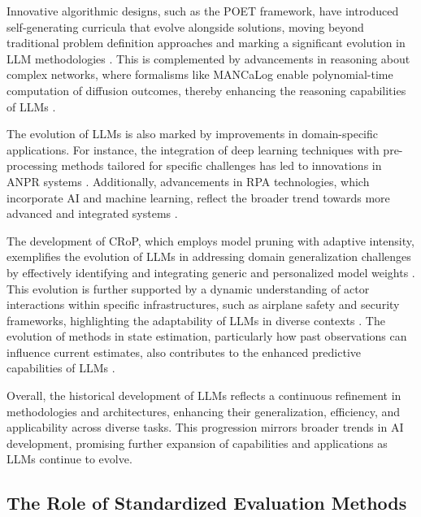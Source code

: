 Innovative algorithmic designs, such as the POET framework, have introduced self-generating curricula that evolve alongside solutions, moving beyond traditional problem definition approaches and marking a significant evolution in LLM methodologies \cite{wang2019pairedopenendedtrailblazerpoet}. This is complemented by advancements in reasoning about complex networks, where formalisms like MANCaLog enable polynomial-time computation of diffusion outcomes, thereby enhancing the reasoning capabilities of LLMs \cite{shakarian2022reasoningcomplexnetworkslogic}.



The evolution of LLMs is also marked by improvements in domain-specific applications. For instance, the integration of deep learning techniques with pre-processing methods tailored for specific challenges has led to innovations in ANPR systems \cite{adak2022automaticnumberplaterecognition}. Additionally, advancements in RPA technologies, which incorporate AI and machine learning, reflect the broader trend towards more advanced and integrated systems \cite{pandy2024advancementsroboticsprocessautomation}.



The development of CRoP, which employs model pruning with adaptive intensity, exemplifies the evolution of LLMs in addressing domain generalization challenges by effectively identifying and integrating generic and personalized model weights \cite{kaur2024cropcontextwiserobuststatic}. This evolution is further supported by a dynamic understanding of actor interactions within specific infrastructures, such as airplane safety and security frameworks, highlighting the adaptability of LLMs in diverse contexts \cite{kammller2020applyingisabelleinsiderframework}. The evolution of methods in state estimation, particularly how past observations can influence current estimates, also contributes to the enhanced predictive capabilities of LLMs \cite{lathouwers2017memorypaysdiscordhidden}.



Overall, the historical development of LLMs reflects a continuous refinement in methodologies and architectures, enhancing their generalization, efficiency, and applicability across diverse tasks. This progression mirrors broader trends in AI development, promising further expansion of capabilities and applications as LLMs continue to evolve.



\subsection{The Role of Standardized Evaluation Methods} \label{subsec:The Role of Standardized Evaluation Methods}




